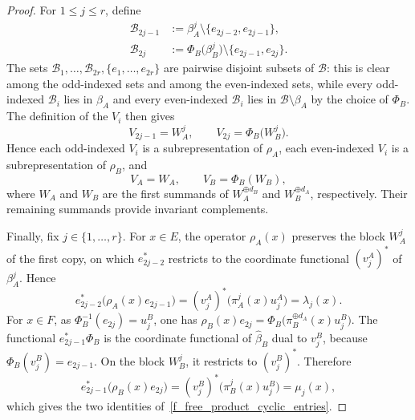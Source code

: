 \begin{proof}
    For \(1\leq j\leq r\), define
    \[
        \begin{aligned}
            \mathcal{B}_{2j-1}&:=\beta_A^j\setminus\{e_{2j-2},e_{2j-1}\},\\
            \mathcal{B}_{2j}&:=\Phi_B\bigl(\beta_B^j\bigr)\setminus\{e_{2j-1},e_{2j}\}.
        \end{aligned}
    \]
    The sets \(\mathcal{B}_1,\ldots,\mathcal{B}_{2r},\{e_1,\ldots,e_{2r}\}\) are pairwise disjoint subsets of \(\mathcal{B}\): this is clear among the odd-indexed sets and among the even-indexed sets, while every odd-indexed \(\mathcal{B}_i\) lies in \(\beta_A\) and every even-indexed \(\mathcal{B}_i\) lies in \(\mathcal{B}\setminus\beta_A\) by the choice of \(\Phi_B\). The definition of the \(V_i\) then gives
    \[
        V_{2j-1}=W_A^j,\qquad V_{2j}=\Phi_B\bigl(W_B^j\bigr).
    \]
    Hence each odd-indexed \(V_i\) is a subrepresentation of \(\rho_A\), each even-indexed \(V_i\) is a subrepresentation of \(\rho_B\), and
    \[
        V_A=W_A,\qquad V_B=\Phi_B(W_B),
    \]
    where \(W_A\) and \(W_B\) are the first summands of \(W_A^{\oplus d_B}\) and \(W_B^{\oplus d_A}\), respectively. Their remaining summands provide invariant complements.

    Finally, fix \(j\in\{1,\ldots,r\}\). For \(x\in E\), the operator \(\rho_A(x)\) preserves the block \(W_A^j\) of the first copy, on which \(e_{2j-2}^*\) restricts to the coordinate functional \((v_j^A)^*\) of \(\beta_A^j\). Hence
    \[
        e_{2j-2}^*\bigl(\rho_A(x)e_{2j-1}\bigr)=(v_j^A)^*\bigl(\pi_A^j(x)u_j^A\bigr)=\lambda_j(x).
    \]
    For \(x\in F\), as \(\Phi_B^{-1}(e_{2j})=u_j^B\), one has \(\rho_B(x)e_{2j}=\Phi_B\bigl(\pi_B^{\oplus d_A}(x)u_j^B\bigr)\). The functional \(e_{2j-1}^*\Phi_B\) is the coordinate functional of \(\widehat{\beta}_B\) dual to \(v_j^B\), because \(\Phi_B(v_j^B)=e_{2j-1}\). On the block \(W_B^j\), it restricts to \((v_j^B)^*\). Therefore
    \[
        e_{2j-1}^*\bigl(\rho_B(x)e_{2j}\bigr)=(v_j^B)^*\bigl(\pi_B^j(x)u_j^B\bigr)=\mu_j(x),
    \]
    which gives the two identities of~\eqref{f_free_product_cyclic_entries}.
\end{proof}

